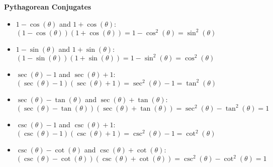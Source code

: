 \documentclass{ximera}
\begin{document}
\begin{callout}
\centerline{\textbf{Pythagorean Conjugates}}  

\begin{itemize}

\item $1 - \cos(\theta)$ and  $1+\cos(\theta)$:\\  $(1-\cos(\theta))(1+\cos(\theta)) = 1 - \cos^{2}(\theta) = \sin^{2}(\theta)$

\item  $1-\sin(\theta)$ and $1 + \sin(\theta)$: \\ $(1-\sin(\theta))(1+\sin(\theta)) = 1 - \sin^{2}(\theta) = \cos^{2}(\theta)$

\item  $\sec(\theta)-1$ and $\sec(\theta)+1$: \\ $(\sec(\theta)-1)(\sec(\theta)+1) = \sec^{2}(\theta) - 1 =  \tan^{2}(\theta)$

\item  $\sec(\theta)-\tan(\theta)$ and $\sec(\theta)+\tan(\theta)$: \\ $(\sec(\theta)-\tan(\theta))(\sec(\theta)+\tan(\theta)) = \sec^{2}(\theta) - \tan^{2}(\theta) = 1$

\item  $\csc(\theta)-1$ and $\csc(\theta)+1$:\\  $(\csc(\theta)-1)(\csc(\theta)+1) = \csc^{2}(\theta) - 1 =  \cot^{2}(\theta)$

\item  $\csc(\theta)-\cot(\theta)$ and $\csc(\theta)+\cot(\theta)$:\\  $(\csc(\theta)-\cot(\theta))(\csc(\theta)+\cot(\theta)) = \csc^{2}(\theta) - \cot^{2}(\theta) = 1$

\smallskip

\end{itemize}
\end{callout}

\end{document}
